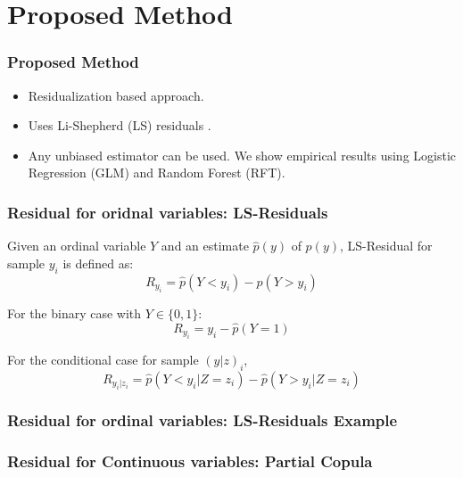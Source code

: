 \documentclass{beamer}
\def\ci{\perp\!\!\!\!\!\perp}
\begin{document}
\section{Proposed Method}
\begin{frame}
	\frametitle{Proposed Method}
	\begin{itemize}
		\setlength\itemsep{1em}
		\item Residualization based approach.
		\item Uses Li-Shepherd (LS) residuals \footnotemark. 
		\item Any unbiased estimator can be used. We show empirical results using Logistic Regression (GLM) and Random Forest (RFT).
	\end{itemize}
\end{frame}


\begin{frame}
	\frametitle{Residual for oridnal variables: LS-Residuals}
	Given an ordinal variable $ Y $ and an estimate $ \hat{p}(y) $ of $
	p(y) $, LS-Residual for sample $ y_i $ is defined as:
	$$ R_{y_i} = \hat{p}(Y < y_i) - \hat{p}(Y > y_i) $$
	\vspace{1em}

	For the binary case with $ Y \in \{0, 1\} $:
	$$ R_{y_i} = y_i - \hat{p}(Y = 1) $$
	\vspace{1em}

	For the conditional case for sample $ (y|z)_i $,
	$$ R_{y_i | z_i} = \hat{p}(Y < y_i | Z=z_i) - \hat{p}(Y>y_i|Z=z_i) $$

\end{frame}

\begin{frame}
	\frametitle{Residual for ordinal variables: LS-Residuals Example}
\end{frame}

\begin{frame}
	\frametitle{Residual for Continuous variables: Partial Copula}
\end{frame}

% 
\end{document}
